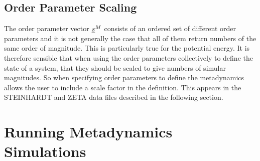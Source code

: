 \subsection{Order Parameter Scaling}
\label{metascaling}
The order parameter vector $\mbox{$\underline{s}$}^{M}$ consists of an ordered set of
different order parameters and it is not generally the case that all of them
return numbers of the same order of magnitude. This is particularly true for
the potential energy. It is therefore sensible that when using the order
parameters collectively to define the state of a system, that they should be
scaled to give numbers of simular magnitudes. So when specifying order
parameters to define the metadynamics \D{} allows the user to include a scale
factor in the definition. This appears in the STEINHARDT and ZETA data files
described in the following section.

\section{Running Metadynamics Simulations}


